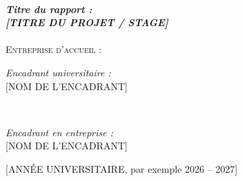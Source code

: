 \begin{titlepage}
\HRule \\[0.4cm]
\textit{\LARGE \bfseries Titre du rapport :}\\[0.4cm]
\textit{\LARGE \bfseries [TITRE DU PROJET / STAGE]}\\
\HRule \\[1cm]


\textsc{\large Entreprise d'accueil :}\\[0.5cm]

\vskip1cm


\begin{minipage}[t]{0.45\textwidth}
    \begin{flushleft} \large
        \emph{Encadrant universitaire :}\\{}
        [NOM DE L'ENCADRANT]
    \end{flushleft}
\end{minipage}
~
\begin{minipage}[t]{0.45\textwidth}
    \begin{flushright} \large
        \emph{Encadrant en entreprise :}\\{}
        [NOM DE L'ENCADRANT]
    \end{flushright}
\end{minipage}

\vfill

{\large [ANNÉE UNIVERSITAIRE, par exemple 2026 -- 2027]}

\end{titlepage}
\restoregeometry
